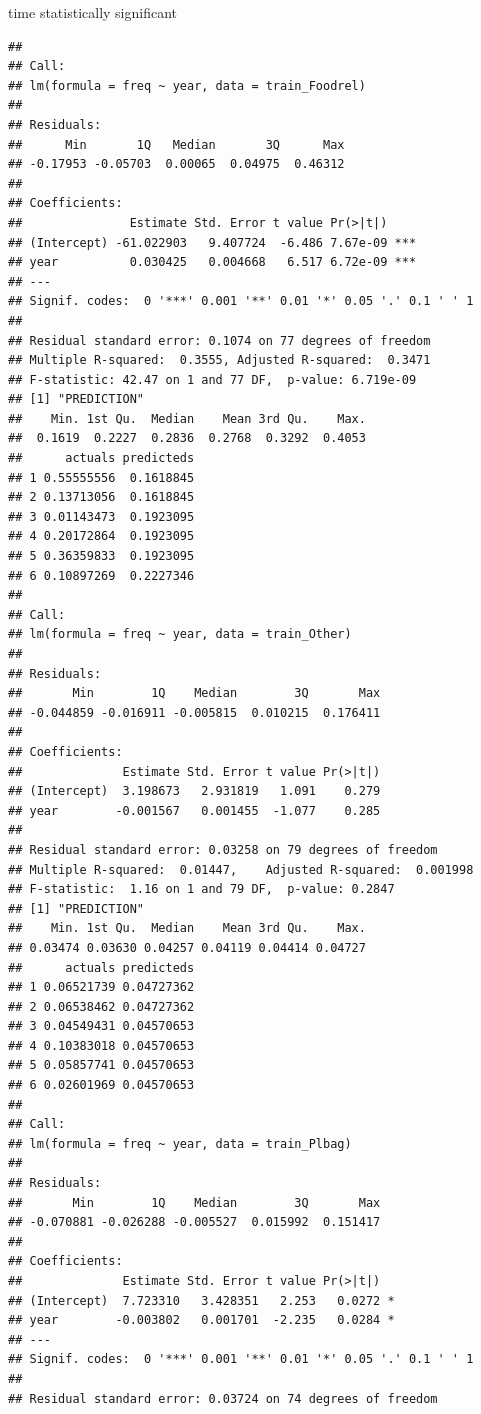 \documentclass[10pt]{article}\usepackage[]{graphicx}\usepackage[]{color}
\makeatletter
\newenvironment{kframe}{%
 \def\at@end@of@kframe{}%
 \ifinner\ifhmode%
  \def\at@end@of@kframe{\end{minipage}}%
  \begin{minipage}{\columnwidth}%
 \fi\fi%
 \def\FrameCommand##1{\hskip\@totalleftmargin \hskip-\fboxsep
 \colorbox{shadecolor}{##1}\hskip-\fboxsep
     \hskip-\linewidth \hskip-\@totalleftmargin \hskip\columnwidth}%
 \MakeFramed {\advance\hsize-\width
   \@totalleftmargin\z@ \linewidth\hsize
   \@setminipage}}%
 {\par\unskip\endMakeFramed%
 \at@end@of@kframe}
\newenvironment{knitrout}{}{} %
\makeatother
\begin{document}
time statistically significant

\begin{knitrout}\small
{}\color{fgcolor}\begin{kframe}
\begin{verbatim}
## 
## Call:
## lm(formula = freq ~ year, data = train_Foodrel)
## 
## Residuals:
##      Min       1Q   Median       3Q      Max 
## -0.17953 -0.05703  0.00065  0.04975  0.46312 
## 
## Coefficients:
##               Estimate Std. Error t value Pr(>|t|)    
## (Intercept) -61.022903   9.407724  -6.486 7.67e-09 ***
## year          0.030425   0.004668   6.517 6.72e-09 ***
## ---
## Signif. codes:  0 '***' 0.001 '**' 0.01 '*' 0.05 '.' 0.1 ' ' 1
## 
## Residual standard error: 0.1074 on 77 degrees of freedom
## Multiple R-squared:  0.3555,	Adjusted R-squared:  0.3471 
## F-statistic: 42.47 on 1 and 77 DF,  p-value: 6.719e-09
## [1] "PREDICTION"
##    Min. 1st Qu.  Median    Mean 3rd Qu.    Max. 
##  0.1619  0.2227  0.2836  0.2768  0.3292  0.4053
##      actuals predicteds
## 1 0.55555556  0.1618845
## 2 0.13713056  0.1618845
## 3 0.01143473  0.1923095
## 4 0.20172864  0.1923095
## 5 0.36359833  0.1923095
## 6 0.10897269  0.2227346
## 
## Call:
## lm(formula = freq ~ year, data = train_Other)
## 
## Residuals:
##       Min        1Q    Median        3Q       Max 
## -0.044859 -0.016911 -0.005815  0.010215  0.176411 
## 
## Coefficients:
##              Estimate Std. Error t value Pr(>|t|)
## (Intercept)  3.198673   2.931819   1.091    0.279
## year        -0.001567   0.001455  -1.077    0.285
## 
## Residual standard error: 0.03258 on 79 degrees of freedom
## Multiple R-squared:  0.01447,	Adjusted R-squared:  0.001998 
## F-statistic:  1.16 on 1 and 79 DF,  p-value: 0.2847
## [1] "PREDICTION"
##    Min. 1st Qu.  Median    Mean 3rd Qu.    Max. 
## 0.03474 0.03630 0.04257 0.04119 0.04414 0.04727
##      actuals predicteds
## 1 0.06521739 0.04727362
## 2 0.06538462 0.04727362
## 3 0.04549431 0.04570653
## 4 0.10383018 0.04570653
## 5 0.05857741 0.04570653
## 6 0.02601969 0.04570653
## 
## Call:
## lm(formula = freq ~ year, data = train_Plbag)
## 
## Residuals:
##       Min        1Q    Median        3Q       Max 
## -0.070881 -0.026288 -0.005527  0.015992  0.151417 
## 
## Coefficients:
##              Estimate Std. Error t value Pr(>|t|)  
## (Intercept)  7.723310   3.428351   2.253   0.0272 *
## year        -0.003802   0.001701  -2.235   0.0284 *
## ---
## Signif. codes:  0 '***' 0.001 '**' 0.01 '*' 0.05 '.' 0.1 ' ' 1
## 
## Residual standard error: 0.03724 on 74 degrees of freedom

\end{verbatim}
\end{kframe}
\end{knitrout}
\end{document}
